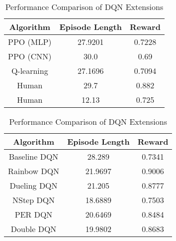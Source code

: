 \documentclass{article}
\begin{document}
\begin{table}[ht]
    \centering
    \begin{minipage}{0.45\textwidth}
        \centering
        \begin{tabular}{|c|c|c|}
            \hline
            \textbf{Algorithm} & \textbf{Episode Length} & \textbf{Reward} \\ \hline
            PPO (MLP)          & 27.9201                 & 0.7228          \\ \hline
            PPO (CNN)          & 30.0                    & 0.69            \\ \hline
            Q-learning         & 27.1696                 & 0.7094          \\ \hline
            Human              & 29.7                    & 0.882          \\ \hline
            Human              & 12.13                    & 0.725         \\ \hline
        \end{tabular}
        \vspace*{4pt}
        \caption{Performance Comparison of Different Algorithms}
        \label{tab:algorithm_performance}
    \end{minipage}
    \hfill
    \begin{minipage}{0.45\textwidth}
        \centering
        \begin{tabular}{|c|c|c|}
            \hline
            \textbf{Algorithm} & \textbf{Episode Length} & \textbf{Reward} \\ \hline
            Baseline DQN       & 28.289                  & 0.7341          \\ \hline
            Rainbow DQN        & 21.9697                 & 0.9006          \\ \hline
            Dueling DQN       & 21.205                  & 0.8777          \\ \hline
            NStep DQN          & 18.6889                 & 0.7503          \\ \hline
            PER DQN            & 20.6469                 & 0.8484          \\ \hline
            Double DQN         & 19.9802                 & 0.8683          \\ \hline
        \end{tabular}
        \vspace*{4pt}
        \caption{Performance Comparison of DQN Extensions}
        \label{tab:dqn_extensions}
    \end{minipage}
\end{table}
\end{document}
